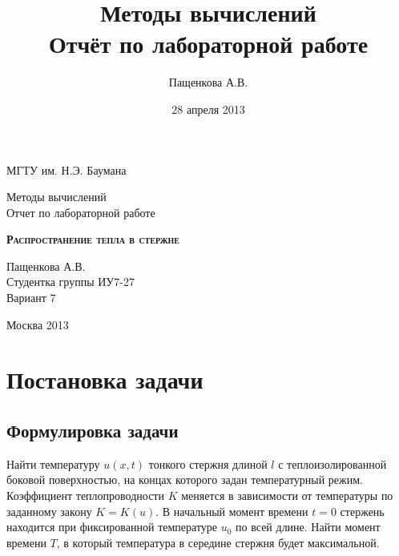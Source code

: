 \documentclass[a4paper,12pt]{article}
\title{ Методы вычислений \\Отчёт по лабораторной работе \textnumero 1 \\  }
\author{Пащенкова А.В.}
\date{28 апреля 2013}
\begin{document}

\begin{titlepage}
\newpage
\begin{center}
МГТУ им. Н.Э. Баумана \\		%
\hrulefill %
\end{center}

\vspace{10em}
\begin{center}
\Large Методы вычислений \\
\vspace{1em}
Отчет по лабораторной работе   
\end{center}


\begin{center}
\textsc{\textbf{Распространение тепла в стержне}}
\end{center}

\vspace{15em}
\begin{flushright}
Пащенкова А.В. \\
Студентка группы ИУ7-27 \\
Вариант 7
\end{flushright}
\vspace{\fill}
\begin{center}
Москва 2013
\end{center}
\end{titlepage}


\newpage

\section{Постановка задачи}
\subsection{Формулировка задачи}

Найти температуру $u(x,t)$ тонкого стержня длиной $l$ с теплоизолированной боковой поверхностью, на концах которого задан температурный режим. Коэффициент теплопроводности $K$ меняется в зависимости от температуры по заданному закону \( K=K(u) \). В начальный момент времени \( t=0 \) стержень находится при фиксированной температуре $u_0$ по всей длине. Найти момент времени $T$, в который температура в середине стержня будет максимальной.
\end{document}
